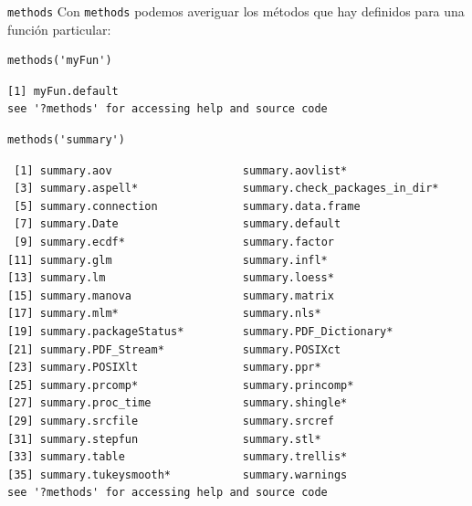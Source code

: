 \documentclass[xcolor={usenames,svgnames,dvipsnames}]{beamer}
\begin{document}
\begin{frame}[label={sec:org0395573},fragile]{\texttt{methods}}
 Con \texttt{methods} podemos averiguar los métodos que hay definidos para una función particular:
\lstset{language=r,label= ,caption= ,captionpos=b,numbers=none}
\begin{lstlisting}
methods('myFun')
\end{lstlisting}

\begin{verbatim}
[1] myFun.default
see '?methods' for accessing help and source code
\end{verbatim}


\lstset{language=r,label= ,caption= ,captionpos=b,numbers=none}
\begin{lstlisting}
methods('summary')
\end{lstlisting}

\begin{verbatim}
 [1] summary.aov                    summary.aovlist*              
 [3] summary.aspell*                summary.check_packages_in_dir*
 [5] summary.connection             summary.data.frame            
 [7] summary.Date                   summary.default               
 [9] summary.ecdf*                  summary.factor                
[11] summary.glm                    summary.infl*                 
[13] summary.lm                     summary.loess*                
[15] summary.manova                 summary.matrix                
[17] summary.mlm*                   summary.nls*                  
[19] summary.packageStatus*         summary.PDF_Dictionary*       
[21] summary.PDF_Stream*            summary.POSIXct               
[23] summary.POSIXlt                summary.ppr*                  
[25] summary.prcomp*                summary.princomp*             
[27] summary.proc_time              summary.shingle*              
[29] summary.srcfile                summary.srcref                
[31] summary.stepfun                summary.stl*                  
[33] summary.table                  summary.trellis*              
[35] summary.tukeysmooth*           summary.warnings              
see '?methods' for accessing help and source code
\end{verbatim}
\end{frame}
\end{document}
